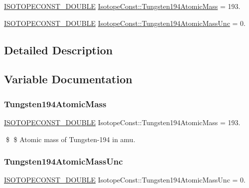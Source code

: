 \begin{DoxyCompactItemize}
\item 
\mbox{\hyperlink{group___isotope_const-_macros_ga8f45a7272ce02c0b4c65c44636ed719a}{I\+S\+O\+T\+O\+P\+E\+C\+O\+N\+S\+T\+\_\+\+D\+O\+U\+B\+LE}} \mbox{\hyperlink{group___isotope_const-_tungsten-_w194_gace25182a657c0a57e5842af8131291ed}{Isotope\+Const\+::\+Tungsten194\+Atomic\+Mass}} = 193.
\item 
\mbox{\hyperlink{group___isotope_const-_macros_ga8f45a7272ce02c0b4c65c44636ed719a}{I\+S\+O\+T\+O\+P\+E\+C\+O\+N\+S\+T\+\_\+\+D\+O\+U\+B\+LE}} \mbox{\hyperlink{group___isotope_const-_tungsten-_w194_ga9ed8540fea16a25eedf85aa585aa8344}{Isotope\+Const\+::\+Tungsten194\+Atomic\+Mass\+Unc}} = 0.
\end{DoxyCompactItemize}


\subsection{Detailed Description}


\subsection{Variable Documentation}
\mbox{\label{group___isotope_const-_tungsten-_w194_gace25182a657c0a57e5842af8131291ed}} 
\subsubsection{\texorpdfstring{Tungsten194\+Atomic\+Mass}{Tungsten194AtomicMass}}
{\footnotesize\ttfamily \mbox{\hyperlink{group___isotope_const-_macros_ga8f45a7272ce02c0b4c65c44636ed719a}{I\+S\+O\+T\+O\+P\+E\+C\+O\+N\+S\+T\+\_\+\+D\+O\+U\+B\+LE}} Isotope\+Const\+::\+Tungsten194\+Atomic\+Mass = 193.}

\$ \$ Atomic mass of Tungsten-\/194 in amu. \mbox{\label{group___isotope_const-_tungsten-_w194_ga9ed8540fea16a25eedf85aa585aa8344}} 
\subsubsection{\texorpdfstring{Tungsten194\+Atomic\+Mass\+Unc}{Tungsten194AtomicMassUnc}}
{\footnotesize\ttfamily \mbox{\hyperlink{group___isotope_const-_macros_ga8f45a7272ce02c0b4c65c44636ed719a}{I\+S\+O\+T\+O\+P\+E\+C\+O\+N\+S\+T\+\_\+\+D\+O\+U\+B\+LE}} Isotope\+Const\+::\+Tungsten194\+Atomic\+Mass\+Unc = 0.}

